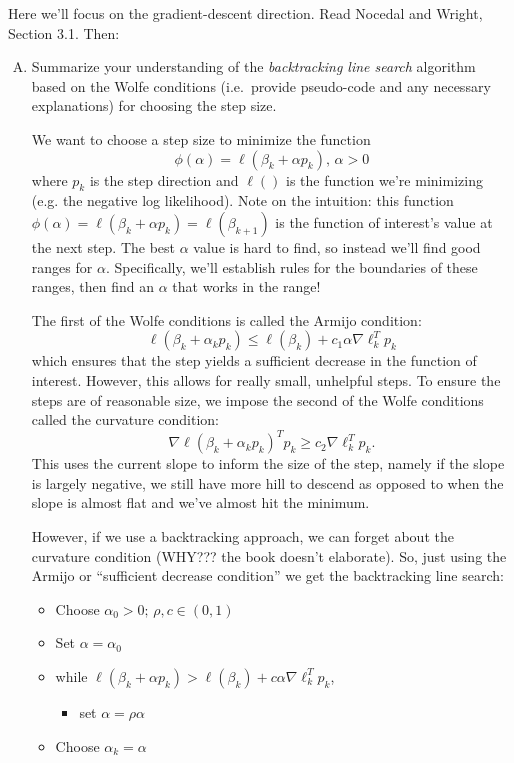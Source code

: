 \documentclass{article}
\begin{document}
Here we'll focus on the gradient-descent direction.  Read Nocedal and Wright, Section 3.1.  Then:

\begin{enumerate}[(A)]
\item Summarize your understanding of the \textit{backtracking line search} algorithm based on the Wolfe conditions (i.e.~provide pseudo-code and any necessary explanations) for choosing the step size.

\color{blue}
We want to choose a step size to minimize the function $$ \phi (\alpha) = \ell (\beta_k + \alpha p_k), \, \alpha > 0$$
where $p_k$ is the step direction and $\ell()$ is the function we're minimizing (e.g. the negative log likelihood). Note on the intuition: this function $ \phi (\alpha) = \ell (\beta_k + \alpha p_k) = \ell(\beta_{k+1})$ is the function of interest's value at the next step.  The best $\alpha$ value is hard to find, so instead we'll find good ranges for $\alpha$. Specifically, we'll establish rules for the boundaries of these ranges, then find an $\alpha$ that works in the range! 

The first of the Wolfe conditions is called the Armijo condition: $$\ell(\beta_k + \alpha_kp_k) \le \ell (\beta_k) + c_1 \alpha  \nabla \ell_k^Tp_k $$ which ensures that the step yields a sufficient decrease in the function of interest. However, this allows for really small, unhelpful steps. To ensure the steps are of reasonable size, we impose the second of the Wolfe conditions called the curvature condition:  $$\nabla \ell (\beta_k + \alpha_kp_k)^Tp_k \ge c_2 \nabla \ell_k^Tp_k.$$ This uses the current slope to inform the size of the step, namely if the slope is largely negative, we still have more hill to descend as opposed to when the slope is almost flat and we've almost hit the minimum. 

However, if we use a backtracking approach, we can forget about the curvature condition (WHY??? the book doesn't elaborate). So, just using the Armijo or ``sufficient decrease condition'' we get the backtracking line search:
\begin{itemize}
\item Choose $\alpha_0 > 0; \, \rho,c \in (0,1)$
\item Set $\alpha = \alpha_0$
\item while $ \ell(\beta_k + \alpha p_k ) > \ell (\beta_k) + c\alpha \nabla \ell^T_k p_k $, 
	\begin{itemize}
	\item set $\alpha = \rho \alpha$
	\end{itemize}
\item Choose $\alpha_k = \alpha$
\end{itemize}
\color{black}


\end{enumerate}
\end{document}
